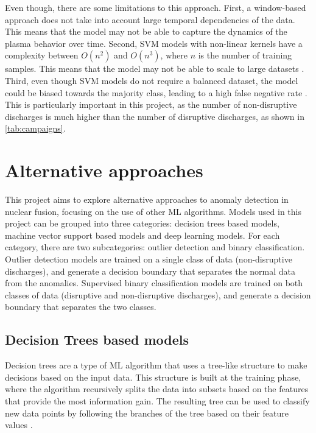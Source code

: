 Even though, there are some limitations to this approach. First, a window-based approach does not take into account large temporal dependencies of the data. This means that the model may not be able to capture the dynamics of the plasma behavior over time. Second, \ac{SVM} models with non-linear kernels have a complexity between $O(n^2)$ and $O(n^3)$, where $n$ is the number of training samples. This means that the model may not be able to scale to large datasets \autocite{kekulawalaSupportVectorMachines2024}. Third, even though \ac{SVM} models do not require a balanced dataset, the model could be biased towards the majority class, leading to a high false negative rate \autocite{10.1007/978-3-540-30115-8_7}. This is particularly important in this project, as the number of non-disruptive discharges is much higher than the number of disruptive discharges, as shown in \autoref{tab:campaigns}.

\section{Alternative approaches}

This project aims to explore alternative approaches to anomaly detection in nuclear fusion, focusing on the use of other \ac{ML} algorithms. Models used in this project can be grouped into three categories: decision trees based models, machine vector support based models and deep learning models. For each category, there are two subcategories: outlier detection and binary classification. Outlier detection models are trained on a single class of data (non-disruptive discharges), and generate a decision boundary that separates the normal data from the anomalies. Supervised binary classification models are trained on both classes of data (disruptive and non-disruptive discharges), and generate a decision boundary that separates the two classes.

\subsection{Decision Trees based models}

Decision trees are a type of \ac{ML} algorithm that uses a tree-like structure to make decisions based on the input data. This structure is built at the training phase, where the algorithm recursively splits the data into subsets based on the features that provide the most information gain. The resulting tree can be used to classify new data points by following the branches of the tree based on their feature values \autocite{1522531}.

